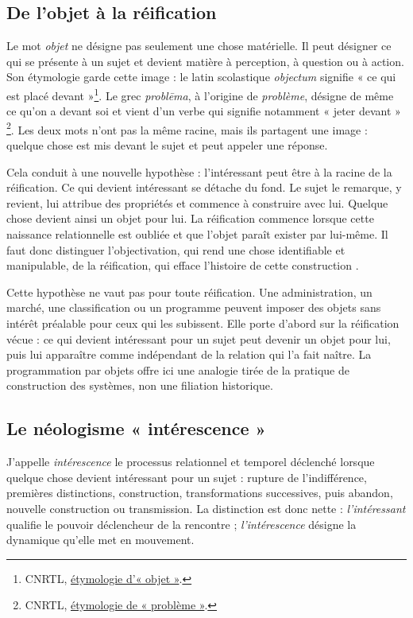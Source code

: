 \documentclass[11pt,a4paper]{article}
\begin{document}
\subsection{De l'objet à la réification}

Le mot \emph{objet} ne désigne pas seulement une chose matérielle. Il peut
désigner ce qui se présente à un sujet et devient matière à perception, à
question ou à action. Son étymologie garde cette image : le latin scolastique
\emph{objectum} signifie « ce qui est placé devant »\footnote{CNRTL,
\href{https://www.cnrtl.fr/etymologie/objet}{étymologie d'« objet »}.}.
Le grec \emph{problēma}, à l'origine de \emph{problème}, désigne de même ce
qu'on a devant soi et vient d'un verbe qui signifie notamment « jeter devant »
\footnote{CNRTL,
\href{https://www.cnrtl.fr/etymologie/probleme}{étymologie de
« problème »}.}. Les deux mots n'ont pas la même racine, mais ils partagent
une image : quelque chose est mis devant le sujet et peut appeler une réponse.

Cela conduit à une nouvelle hypothèse : l'intéressant peut être à la racine de
la réification. Ce qui devient intéressant se détache du fond. Le sujet le
remarque, y revient, lui attribue des propriétés et commence à construire avec
lui. Quelque chose devient ainsi un objet pour lui. La réification commence
lorsque cette naissance relationnelle est oubliée et que l'objet paraît exister
par lui-même. Il faut donc distinguer l'objectivation, qui rend une chose
identifiable et manipulable, de la réification, qui efface l'histoire de cette
construction \parencite{pachet2004reification}.

Cette hypothèse ne vaut pas pour toute réification. Une administration, un
marché, une classification ou un programme peuvent imposer des objets sans
intérêt préalable pour ceux qui les subissent. Elle porte d'abord sur la
réification vécue : ce qui devient intéressant pour un sujet peut devenir un
objet pour lui, puis lui apparaître comme indépendant de la relation qui l'a
fait naître. La programmation par objets offre ici une analogie tirée de la
pratique de construction des systèmes, non une filiation historique.

\subsection{Le néologisme « intérescence »}

J'appelle \emph{intérescence} le processus relationnel et temporel déclenché
lorsque quelque chose devient intéressant pour un sujet : rupture de
l'indifférence, premières distinctions, construction, transformations
successives, puis abandon, nouvelle construction ou transmission. La distinction est donc
nette : \emph{l'intéressant} qualifie le pouvoir déclencheur de la rencontre ;
\emph{l'intérescence} désigne la dynamique qu'elle met en mouvement.
\end{document}
